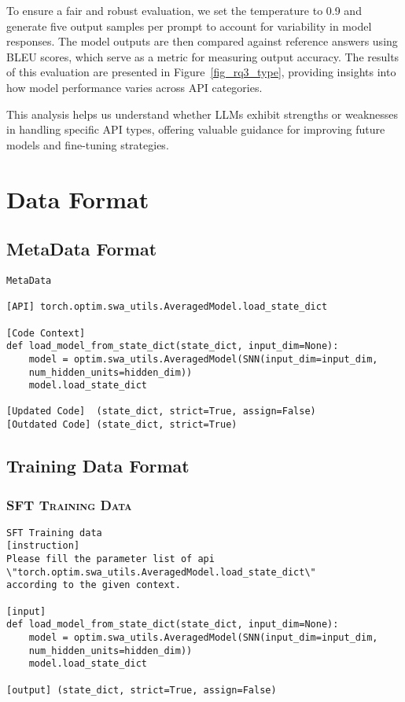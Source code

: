 To ensure a fair and robust evaluation, we set the temperature to 0.9 and generate five output samples per prompt to account for variability in model responses. The model outputs are then compared against reference answers using BLEU scores, which serve as a metric for measuring output accuracy. The results of this evaluation are presented in Figure~\ref{fig_rq3_type}, providing insights into how model performance varies across API categories.

This analysis helps us understand whether LLMs exhibit strengths or weaknesses in handling specific API types, offering valuable guidance for improving future models and fine-tuning strategies.

\clearpage
\section{Data Format}

\subsection{MetaData Format}
\label{Metadata}
\vspace{-0.5em}
\begin{tcolorbox}[colback=gray!5!white, width=\linewidth, left=1mm, right=-3mm, top=1mm, bottom=1mm]
\begin{Verbatim}[fontsize=\normalsize]
MetaData

[API] torch.optim.swa_utils.AveragedModel.load_state_dict

[Code Context]
def load_model_from_state_dict(state_dict, input_dim=None):
    model = optim.swa_utils.AveragedModel(SNN(input_dim=input_dim,
    num_hidden_units=hidden_dim))
    model.load_state_dict
    
[Updated Code]  (state_dict, strict=True, assign=False)
[Outdated Code] (state_dict, strict=True)
\end{Verbatim}
\end{tcolorbox}

\subsection{Training Data Format}
\subsubsection{\textsc{SFT Training Data}}
\begin{tcolorbox}[colback=gray!5!white, width=\linewidth, left=1mm, right=-3mm, top=1mm, bottom=1mm]
\begin{Verbatim}[fontsize=\normalsize]
SFT Training data
[instruction] 
Please fill the parameter list of api
\"torch.optim.swa_utils.AveragedModel.load_state_dict\" 
according to the given context.

[input]
def load_model_from_state_dict(state_dict, input_dim=None):
    model = optim.swa_utils.AveragedModel(SNN(input_dim=input_dim,
    num_hidden_units=hidden_dim))
    model.load_state_dict
    
[output] (state_dict, strict=True, assign=False)
\end{Verbatim}
\end{tcolorbox}

